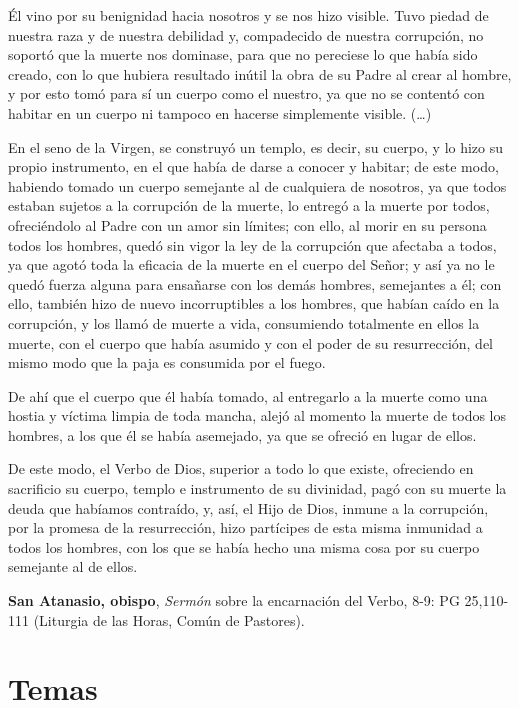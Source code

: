 \begin{patercite}
Él vino por su benignidad hacia nosotros y se nos hizo visible. Tuvo piedad de nuestra raza y de nuestra debilidad y, compadecido de nuestra corrupción, no soportó que la muerte nos dominase, para que no pereciese lo que había sido creado, con lo que hubiera resultado inútil la obra de su Padre al crear al hombre, y por esto tomó para sí un cuerpo como el nuestro, ya que no se contentó con habitar en un cuerpo ni tampoco en hacerse simplemente visible. (\ldots) 

En el seno de la Virgen, se construyó un templo, es decir, su cuerpo, y lo hizo su propio instrumento, en el que había de darse a conocer y habitar; de este modo, habiendo tomado un cuerpo semejante al de cualquiera de nosotros, ya que todos estaban sujetos a la corrupción de la muerte, lo entregó a la muerte por todos, ofreciéndolo al Padre con un amor sin límites; con ello, al morir en su persona todos los hombres, quedó sin vigor la ley de la corrupción que afectaba a todos, ya que agotó toda la eficacia de la muerte en el cuerpo del Señor; y así ya no le quedó fuerza alguna para ensañarse con los demás hombres, semejantes a él; con ello, también hizo de nuevo incorruptibles a los hombres, que habían caído en la corrupción, y los llamó de muerte a vida, consumiendo totalmente en ellos la muerte, con el cuerpo que había asumido y con el poder de su resurrección, del mismo modo que la paja es consumida por el fuego.

De ahí que el cuerpo que él había tomado, al entregarlo a la muerte como una hostia y víctima limpia de toda mancha, alejó al momento la muerte de todos los hombres, a los que él se había asemejado, ya que se ofreció en lugar de ellos.

De este modo, el Verbo de Dios, superior a todo lo que existe, ofreciendo en sacrificio su cuerpo, templo e instrumento de su divinidad, pagó con su muerte la deuda que habíamos contraído, y, así, el Hijo de Dios, inmune a la corrupción, por la promesa de la resurrección, hizo partícipes de esta misma inmunidad a todos los hombres, con los que se había hecho una misma cosa por su cuerpo semejante al de ellos.

\textbf{San Atanasio, obispo}, \textit{Sermón} sobre la encarnación del Verbo, 8-9: PG 25,110-111 (Liturgia de las Horas, Común de Pastores).
\end{patercite}

\newsection
\section{Temas}

